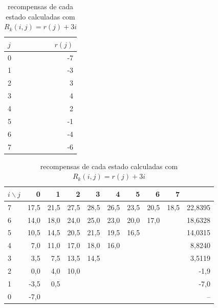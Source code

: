 \documentclass[dvipsnames]{book}
\begin{document}
\begin{table}[!h]
\parbox{.25\linewidth}{
\centering
\vspace{0.2cm}
\begin{tabular}{l|r}
$j$  & $r(j)$ \\ \hline
0 & -7  \\
1 & -3     \\
2 & 3      \\
3 & 4      \\
4 & 2     \\
5 & -1    \\
6 & -4     \\
7 & -6
\end{tabular}
\caption{recompensas-base para $j = 0, \ldots, 7$}
\label{tab:rjplay}
}
\hfill
\parbox{.70\linewidth}{
\centering
\begin{tabular}{l|rrrrrrrr|r}
$i \backslash j$ & 0     & 1  & 2  & 3  & 4  & 5  & 6  & 7  & \\ \hline
7 & 17,5 & 21,5 & 27,5 & 28,5 & 26,5 & 23,5 & 20,5 & 18,5  & 22,8395\\
6 & 14,0 & 18,0 & 24,0 & 25,0 & 23,0 & 20,0 & 17,0 &       & 18,6328\\
5 & 10,5 & 14,5 & 20,5 & 21,5 & 19,5 & 16,5 && & 14,0315 \\
4 & 7,0 & 11,0 & 17,0 & 18,0 & 16,0 &&&& 8,8240 \\
3 & 3,5 & 7,5 & 13,5 & 14,5 &&&& & 3,5119\\
2 & 0,0 & 4,0 & 10,0 &&&&&& -1,9 \\
1 & -3,5 & 0,5 &&&&& && -7,0\\
0 & -7,0 &&&& &&&& --
\end{tabular}
\caption{recompensas de cada estado calculadas com $R_k(i,j) = r(j) + 3i$}
\label{tab:Rijplay}
}
\end{table}
\end{document}
